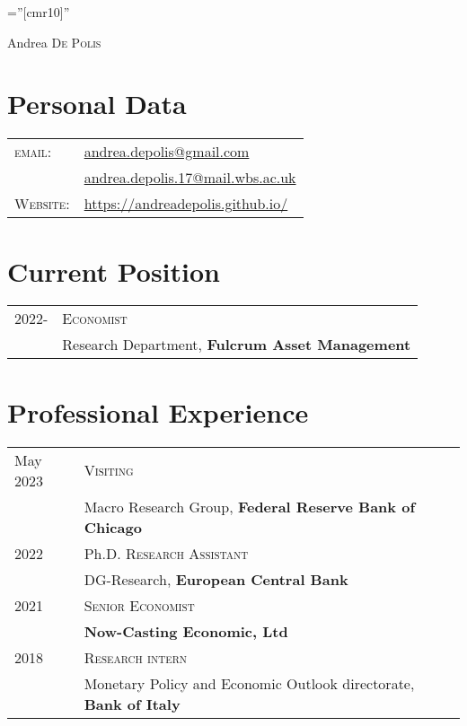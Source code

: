\documentclass[a4paper,12pt]{article}
\begin{document}
\font\fb=''[cmr10]''

\par{\centering
		{\Huge Andrea \textsc{De Polis}
	}\par}

\section{Personal Data}
\renewcommand{\arraystretch}{0.75}
\begin{tabular}{ll}
        \textsc{email:}     & \href{mailto:andrea.depolis@gmail.com}{andrea.depolis@gmail.com}\\
                        & \href{mailto:andrea.depolis.17@mail.wbs.ac.uk}{andrea.depolis.17@mail.wbs.ac.uk} \\
    \textsc{Website:}   & \url{https://andreadepolis.github.io/}            
                        
\end{tabular}
\section{Current Position}
\begin{tabular}{ll}
2022- & \textsc{Economist}\\
& Research Department, \textbf{Fulcrum Asset Management}
\end{tabular}

\section{Professional Experience}
\begin{tabular}{ll}
May 2023 & \textsc{Visiting}\\
& Macro Research Group, \textbf{Federal Reserve Bank of Chicago}\\[1em]
2022 & Ph.D. \textsc{Research Assistant}\\
&DG-Research, \textbf{European Central Bank}\\[1em]
2021 & \textsc{Senior Economist}\\
&\textbf{Now-Casting Economic, Ltd}\\[1em]
2018 & \textsc{Research intern} \\
&Monetary Policy and Economic Outlook directorate, \textbf{Bank of Italy}
\end{tabular}
\end{document}
